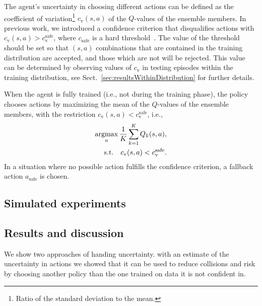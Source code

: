 
The agent's uncertainty in choosing different actions can be defined as the coefficient of variation\footnote{Ratio of the standard deviation to the mean.} $c_\mathrm{v}(s,a)$ of the $Q$-values of the ensemble members.  
In previous work, we introduced a confidence criterion that disqualifies actions with $c_\mathrm{v}(s,a) > c_\mathrm{v}^\mathrm{safe}$, where $c_\mathrm{safe}$ is a hard threshold~\cite{Hoel2020}. 
The value of the threshold should be set so that $(s,a)$ combinations that are contained in the training distribution are accepted, and those which are not will be rejected. This value can be determined by observing values of $c_\mathrm{v}$ in testing episodes within the training distribution, see Sect.~\ref{sec:resultsWithinDistribution} for further details. 



When the agent is fully trained (i.e., not during the training phase), the policy chooses actions by maximizing the mean of the $Q$-values of the ensemble members, with the restriction $c_\mathrm{v}(s,a) < c_\mathrm{v}^\mathrm{safe}$, i.e.,
%
\begin{equation}
	\begin{aligned}
		\operatorname*{argmax}_{a} \frac{1}{K} \sum_{k=1}^K Q_k(s,a),\\
		\textrm{s.t.} \quad c_\mathrm{v}(s,a) < c_\mathrm{v}^\mathrm{safe}.
	\end{aligned}
\end{equation}
%
In a situation where no possible action fulfills the confidence criterion, a fallback action $a_\mathrm{safe}$ is chosen.

\subsection{Simulated experiments}

\subsection{Results and discussion}
We show two approaches of handing uncertainty. with an estimate of the uncertainty in actions we showed that it can be used to reduce collisions and risk by choosing another policy than the one trained on data it is not confident in. 

